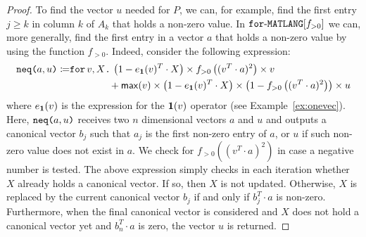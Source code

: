 \begin{proof}
    To find the vector $u$ needed for $P$, we can, for example, find the first entry $j\geq k$ in column $k$ of $A_k$ that holds a non-zero value. In $\texttt{for}\text{-}\texttt{MATLANG}[f_{>0}]$  we can, more generally, find the first entry in a vector $a$ that holds a non-zero value by using the function $f_{>0}$. Indeed, consider the following expression:
    \begin{align*}\allowdisplaybreaks
       \nneq{a}{u} \coloneqq  &\texttt{for}\, v,X \texttt{.}\, \left( 1-e_{\ones}(v)^T\cdot X \right) \times f_{>0}\left( ( v^T\cdot a )^2 \right)\times v \\
        &\hspace{4em}+ \mathsf{max}(v)\times\left( 1-e_{\ones}(v)^T\cdot X \right)\times \left( 1 - f_{>0}\left( ( v^T\cdot a )^2 \right) \right) \times u \\
    \end{align*}
where $e_{\mathbf{1}}(v)$ is the expression for the $\mathbf{1}(v)$ operator (see Example~\ref{ex:onevec}).
Here, $\texttt{neq(}a,u\texttt{)}$ receives two $n$ dimensional vectors $a$ and $u$ and outputs a 
    canonical vector $b_j$ such that $a_j$ is the first non-zero entry of $a$, or $u$ if such non-zero value does not exist in $a$. We check for $f_{>0}((v^T\cdot a)^2)$ 
    in case a negative number is tested. The above expression simply checks in each iteration
    whether $X$ already holds a canonical vector. If so, then $X$ is not updated. Otherwise,
    $X$ is replaced by the current canonical vector $b_j$ if and only if $b_j^T\cdot a$ is non-zero. Furthermore, when the final canonical vector is considered and $X$ does not hold
    a canonical vector yet and $b_n^T\cdot a$ is zero, the vector $u$ is returned.


\end{proof}
